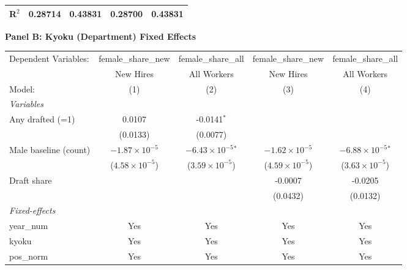 \begin{table}[htbp]
\begin{threeparttable}
\begin{tabular}{lcccc}
   R$^2$                 & 0.28714                 & 0.43831                 & 0.28700                 & 0.43831\\  
   \midrule \midrule
\end{tabular}
\par\endgroup
\vspace{2ex}
\textbf{Panel B: Kyoku (Department) Fixed Effects}\\[1ex]
\begingroup
\centering
\begin{tabular}{lcccc}
   \tabularnewline \midrule \midrule
   Dependent Variables:  & female\_share\_new      & female\_share\_all           & female\_share\_new      & female\_share\_all\\    
                         & New Hires               & All Workers                  & New Hires               & All Workers \\   
   Model:                & (1)                     & (2)                          & (3)                     & (4)\\  
   \midrule
   \emph{Variables}\\
   Any drafted (=1)      & 0.0107                  & -0.0141$^{*}$                &                         &   \\   
                         & (0.0133)                & (0.0077)                     &                         &   \\   
   Male baseline (count) & $-1.87\times 10^{-5}$   & $-6.43\times 10^{-5}$$^{*}$  & $-1.62\times 10^{-5}$   & $-6.88\times 10^{-5}$$^{*}$\\    
                         & ($4.58\times 10^{-5}$)  & ($3.59\times 10^{-5}$)       & ($4.59\times 10^{-5}$)  & ($3.63\times 10^{-5}$)\\    
   Draft share           &                         &                              & -0.0007                 & -0.0205\\   
                         &                         &                              & (0.0432)                & (0.0132)\\   
   \midrule
   \emph{Fixed-effects}\\
   year\_num             & Yes                     & Yes                          & Yes                     & Yes\\  
   kyoku                 & Yes                     & Yes                          & Yes                     & Yes\\  
   pos\_norm             & Yes                     & Yes                          & Yes                     & Yes\\  

\end{tabular}
\end{threeparttable}
\end{table}
